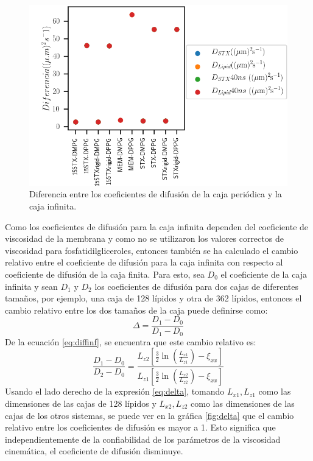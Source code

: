 \begin{figure}
\begin{center}
    \includegraphics[scale=0.35]{Plots/differences.png}
  \caption{Diferencia entre los coeficientes de difusi\'{o}n de la caja peri\'{o}dica y la caja infinita.}
  \label{fig:ddiff}
\end{center}
\end{figure}
Como los coeficientes de difusi\'{o}n para la caja infinita dependen del coeficiente de viscosidad de la membrana y como no se utilizaron los valores correctos de viscosidad para fosfatidilgliceroles, entonces tambi\'{e}n se ha calculado el cambio relativo entre el coeficiente de difusi\'{o}n para la caja infinita con respecto al coeficiente de difusi\'{o}n de la caja finita. Para esto, sea $D_0$ el coeficiente de la caja infinita y sean $D_1$ y $D_2$ los coeficientes de difusi\'{o}n para dos cajas de diferentes tama\~{n}os, por ejemplo, una caja de 128 l\'{i}pidos y otra de 362 l\'{i}pidos, entonces el cambio relativo entre los dos tama\~{n}os de la caja puede definirse como:
\begin{equation}
\Delta=\frac{D_1-D_0}{D_1-D_0}    
\end{equation}
De la ecuaci\'{o}n \eqref{eq:diffinf}, se encuentra que este cambio relativo es:
\begin{equation}\label{eq:delta}
\frac{D_1-D_0}{D_2-D_0}=\frac{L_{z2}\left[\frac{3}{2}\ln{\left(\frac{L_{x1}}{L_{z1}}\right)}-\xi_{xx}\right]}{L_{z1}\left[\frac{3}{2}\ln{\left(\frac{L_{x2}}{L_{z2}}\right)}-\xi_{xx}\right]}
\end{equation}
Usando el lado derecho de la expresi\'{o}n \eqref{eq:delta}, tomando $L_{x1}, L_{z1}$ como las dimensiones de las cajas de 128 l\'{i}pidos y $L_{x2}, L_{z2}$   como las dimensiones de las cajas de los otros sistemas, se puede ver en la gr\'{a}fica \ref{fig:delta} que el cambio relativo entre los coeficientes de difusi\'{o}n es mayor a 1. Esto significa que independientemente de la confiabilidad de los par\'{a}metros de la viscosidad cinem\'{a}tica, el coeficiente de difusi\'{o}n disminuye.\\

